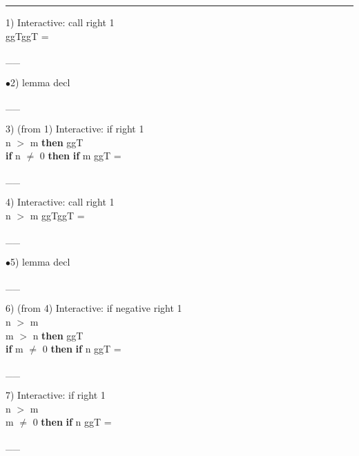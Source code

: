 \documentclass[a4paper]{article}
\begin{document}
\vspace{3ex}\rule{1\textwidth}{1mm}


1) Interactive: call right  1\\
 \Fol \Do ggT\Dc \Do ggT\Dc {} = 

\vspace{-1.5ex}\_\hrulefill \_

$\bullet$2) lemma decl \\
 \Fol 

\vspace{-1.5ex}\_\hrulefill \_

3)  (from 1) Interactive: if right  1\\
\Fol {} n $>$ m {\bf then} ggT \\
 \tabf {} {\bf if} n $\neq$ 0 {\bf then} {\bf if} m %
\Do ggT\Dc {} = 

\vspace{-1.5ex}\_\hrulefill \_

4) Interactive: call right  1\\
n $>$ m \Fol \Do ggT\Dc \Do ggT\Dc {} = 

\vspace{-1.5ex}\_\hrulefill \_

$\bullet$5) lemma decl \\
 \Fol 

\vspace{-1.5ex}\_\hrulefill \_

6)  (from 4) Interactive: if negative right  1\\
\tabf n $>$ m \\
\Fol {} m $>$ n {\bf then} ggT \\
 \tabf {} {\bf if} m $\neq$ 0 {\bf then} {\bf if} n %
\Do ggT\Dc {} = 

\vspace{-1.5ex}\_\hrulefill \_

7) Interactive: if right  1\\
\tabf n $>$ m \\
\Fol {} m $\neq$ 0 {\bf then} {\bf if} n %
\Do ggT\Dc {} = 

\vspace{-1.5ex}\_\hrulefill \_
\end{document}
